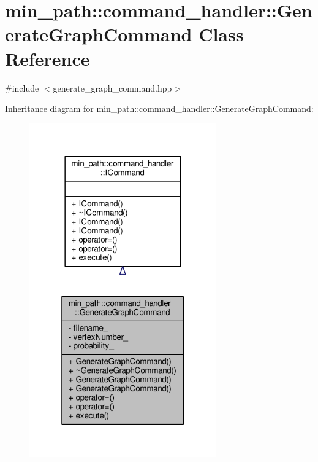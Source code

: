 \hypertarget{a00006}{}\section{min\+\_\+path\+:\+:command\+\_\+handler\+:\+:Generate\+Graph\+Command Class Reference}
\label{a00006}


{\ttfamily \#include $<$generate\+\_\+graph\+\_\+command.\+hpp$>$}



Inheritance diagram for min\+\_\+path\+:\+:command\+\_\+handler\+:\+:Generate\+Graph\+Command\+:
\nopagebreak
\begin{figure}[H]
\begin{center}
\leavevmode
\includegraphics[width=229pt]{d9/da5/a00075}
\end{center}
\end{figure}


